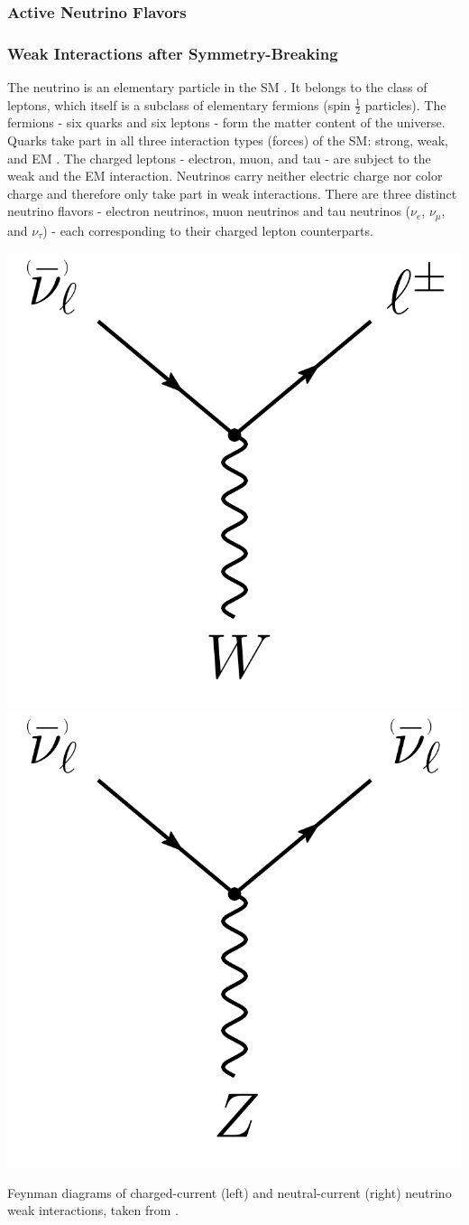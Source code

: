 \subsubsection{Active Neutrino Flavors}

\subsubsection{Weak Interactions after Symmetry-Breaking} 


The neutrino is an elementary particle in the SM .
It belongs to the class of leptons, which itself is a subclass of elementary fermions (spin ${\frac{1}{2}}$ particles).
The fermions - six quarks and six leptons - form the matter content of the universe.
Quarks take part in all three interaction types (forces) of the SM: strong, weak, and EM .
The charged leptons - electron, muon, and tau - are subject to the weak and the EM interaction.
Neutrinos carry neither electric charge nor color charge and therefore only take part in weak interactions.
There are three distinct neutrino flavors - electron neutrinos, muon neutrinos and tau neutrinos ($\nu_e$, $\nu_{\mu}$, and $\nu_{\tau}$)  - each corresponding to their charged lepton counterparts.

\begin{marginfigure}
	\centering
    \includegraphics[width=0.49\linewidth]{figures/neutrinos_properties/feynman_CC_nu.pdf}
    \includegraphics[width=0.49\linewidth]{figures/neutrinos_properties/feynman_NC_nu.pdf}
    \caption[Feynman diagrams of neutrino weak interactions]{Feynman diagrams of charged-current (left) and neutral-current (right) neutrino weak interactions, taken from \cite{ATerliuk}.}
\end{marginfigure}

